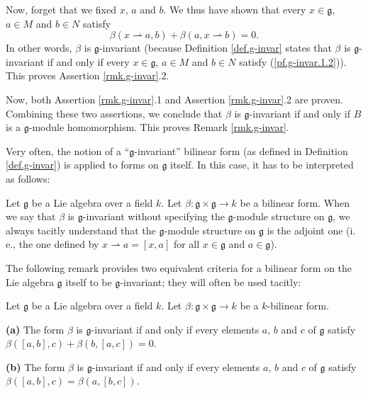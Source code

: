 \documentclass[etingof-lie.tex]{subfiles}
\begin{document}
\begin{verlong}
Now, forget that we fixed $x$, $a$ and $b$. We thus have shown that every
$x\in\mathfrak{g}$, $a\in M$ and $b\in N$ satisfy%
\begin{equation}
\beta\left(  x\rightharpoonup a,b\right)  +\beta\left(  a,x\rightharpoonup
b\right)  =0. \label{pf.g-invar.1.2}%
\end{equation}
In other words, $\beta$ is $\mathfrak{g}$-invariant (because Definition
\ref{def.g-invar} states that $\beta$ is $\mathfrak{g}$-invariant if and only
if every $x\in\mathfrak{g}$, $a\in M$ and $b\in N$ satisfy
(\ref{pf.g-invar.1.2})). This proves Assertion \ref{rmk.g-invar}.2.

Now, both Assertion \ref{rmk.g-invar}.1 and Assertion \ref{rmk.g-invar}.2 are
proven. Combining these two assertions, we conclude that $\beta$ is
$\mathfrak{g}$-invariant if and only if $B$ is a $\mathfrak{g}$-module
homomorphism. This proves Remark \ref{rmk.g-invar}.
\end{verlong}

Very often, the notion of a ``$\mathfrak{g}$-invariant'' bilinear form (as
defined in Definition \ref{def.g-invar}) is applied to forms on $\mathfrak{g}$
itself. In this case, it has to be interpreted as follows:

\begin{Convention}
\label{conv.g-invar}Let $\mathfrak{g}$ be a Lie algebra over a field $k$. Let
$\beta:\mathfrak{g}\times\mathfrak{g}\rightarrow k$ be a bilinear form. When
we say that $\beta$ is $\mathfrak{g}$-invariant without specifying the
$\mathfrak{g}$-module structure on $\mathfrak{g}$, we always tacitly
understand that the $\mathfrak{g}$-module structure on $\mathfrak{g}$ is the
adjoint one (i. e., the one defined by $x\rightharpoonup a=\left[  x,a\right]
$ for all $x\in\mathfrak{g}$ and $a\in\mathfrak{g}$).
\end{Convention}

The following remark provides two equivalent criteria for a bilinear form on
the Lie algebra $\mathfrak{g}$ itself to be $\mathfrak{g}$-invariant; they
will often be used tacitly:

\begin{remark}
\label{rmk.g-invar.g}Let $\mathfrak{g}$ be a Lie algebra over a field $k$. Let
$\beta:\mathfrak{g}\times\mathfrak{g}\rightarrow k$ be a $k$-bilinear form.

\textbf{(a)} The form $\beta$ is $\mathfrak{g}$-invariant if and only if every
elements $a$, $b$ and $c$ of $\mathfrak{g}$ satisfy $\beta\left(  \left[
a,b\right]  ,c\right)  +\beta\left(  b,\left[  a,c\right]  \right)  =0$.

\textbf{(b)} The form $\beta$ is $\mathfrak{g}$-invariant if and only if every
elements $a$, $b$ and $c$ of $\mathfrak{g}$ satisfy $\beta\left(  \left[
a,b\right]  ,c\right)  =\beta\left(  a,\left[  b,c\right]  \right)  $.
\end{remark}
\end{document}

